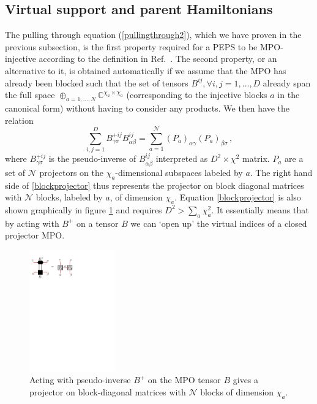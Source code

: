 \documentclass[12 pt]{article}
\begin{document}
\subsection{Virtual support and parent Hamiltonians}
\label{subsec:virtualsupport}
The pulling through equation (\ref{pullingthrough2}), which we have proven in the previous subsection, is the first property required for a PEPS to be MPO-injective according to the definition in Ref.~\cite{MPOpaper}. The second property, or an alternative to it, is obtained automatically if we assume that the MPO has already been blocked such that the set of tensors ${B^{ij},\forall i,j=1,\ldots,D}$ already span the full space $\oplus_{a=1,\ldots,N} \mathbb{C}^{\chi_a\times \chi_a}$ (corresponding to the injective blocks $a$ in the canonical form) without having to consider any products. We then have the relation
\begin{equation} \label{blockprojector}
\sum_{i,j = 1}^D B^{+ij}_{\gamma\sigma}B^{ij}_{\alpha\beta} = \sum_{a=1}^{\mathcal{N}} (P_a)_{\alpha\gamma} (P_a)_{\beta\sigma}\, ,
\end{equation}
where $B^{+ij}_{\gamma\sigma}$ is the pseudo-inverse of $B^{ij}_{\alpha\beta}$ interpreted as $D^2 \times \chi^2$ matrix. $P_a$ are a set of $\mathcal{N}$ projectors on the $\chi_a$-dimensional subspaces labeled by $a$. The right hand side of \eqref{blockprojector} thus represents the projector on block diagonal matrices with $\mathcal{N}$ blocks, labeled by $a$, of dimension $\chi_a$. Equation \eqref{blockprojector} is also shown graphically in figure \ref{generalizedinverse} and requires $D^2 > \sum_{a} \chi_a^2$. It essentially means that by acting with $B^+$ on a tensor $B$ we can `open up' the virtual indices of a closed projector MPO. 

\begin{figure}
  \centering
    \includegraphics[width=0.33\textwidth]{n9}
\caption{Acting with pseudo-inverse $B^+$ on the MPO tensor $B$ gives a projector on block-diagonal matrices with $\mathcal{N}$ blocks of dimension $\chi_a$.}
\label{generalizedinverse}
\end{figure}
\end{document}
